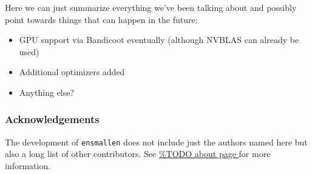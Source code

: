 \documentclass{article}
\begin{document}
Here we can just summarize everything we've been talking about and possibly
point towards things that can happen in the future:

\begin{itemize}
  \item GPU support via Bandicoot eventually (although NVBLAS can already be
used)
  \item Additional optimizers added
  \item Anything else?
\end{itemize}

\subsubsection*{Acknowledgements}

The development of {\tt ensmallen} does not include just the authors named
here but also a long list of other contributors.  See \url{%
} for more information.



\end{document}
